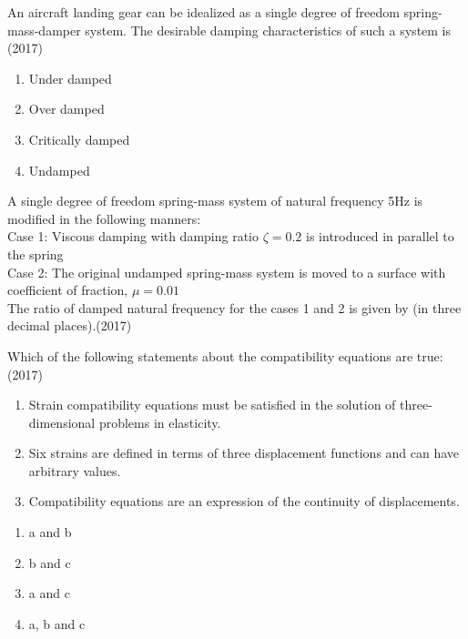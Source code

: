     \item An aircraft landing gear can be idealized as a single degree of freedom spring-mass-damper system. The desirable damping characteristics of such a system is  \hfill (2017)
     \begin{enumerate}[label=(\Alph*)]
        \item Under damped
        \item Over damped
        \item Critically damped
        \item Undamped
     \end{enumerate}
    \item A single degree of freedom spring-mass system of natural frequency 5Hz is modified in the following manners:
    \\ Case 1: Viscous damping with damping ratio $\zeta = 0.2$ is introduced in parallel to the spring
    \\ Case 2: The original undamped spring-mass system is moved to a surface with coefficient of fraction, $\mu = 0.01$\\
    The ratio of damped natural frequency for the cases 1 and 2 is given by (in three decimal places).\hfill (2017)
    \item  Which of the following statements about the compatibility equations are true:\hfill (2017)
    \begin{enumerate}
        \item Strain compatibility equations must be satisfied in the solution of three-dimensional problems in elasticity.
        \item Six strains are defined in terms of three displacement functions and can have arbitrary values.
        \item Compatibility equations are an expression of the continuity of displacements.
    \end{enumerate}
    \begin{enumerate}[label=(\Alph*)]
        \item a and b 
        \item b and c 
        \item a and c 
        \item a, b and c 
    \end{enumerate}
    
